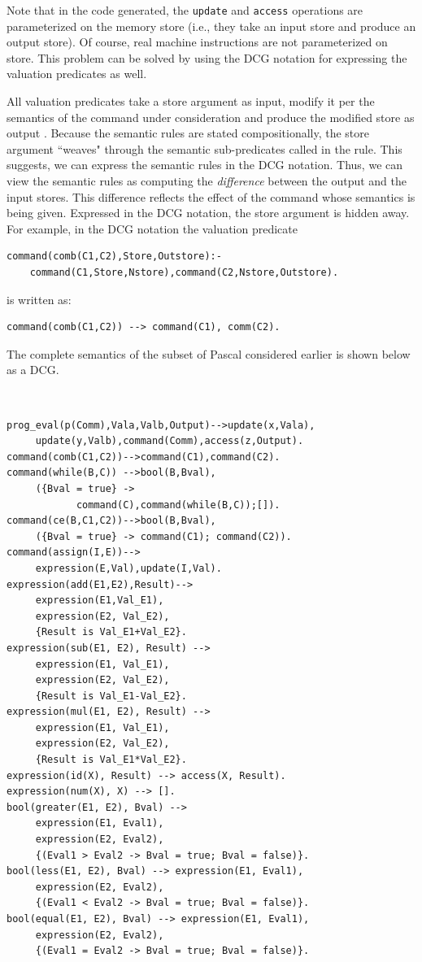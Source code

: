 \documentclass{entcs}
\begin{document}
Note that in the code generated, the {\tt update}
and {\tt access} operations are parameterized on the 
memory store (i.e., they take an input store and produce
an output store). Of course, real machine instructions
are not parameterized on store.
This problem can be solved by using the DCG notation
for expressing the valuation predicates as well.

All valuation predicates take a store
argument as input, modify it per the semantics of the
command under consideration and produce the modified
store as output \cite{logden}. Because
the semantic rules are stated compositionally, the
store argument ``weaves" through the semantic
sub-predicates called in the rule. This suggests,
we can express the semantic rules in the DCG notation.
Thus, we can view the semantic rules as computing
the {\it difference} between the output and the input
stores. This difference reflects the effect of the
command whose semantics is being given. Expressed in
the DCG notation, the store argument is hidden
away. For example, in the DCG notation the valuation predicate 

\begin{verbatim}
command(comb(C1,C2),Store,Outstore):- 
    command(C1,Store,Nstore),command(C2,Nstore,Outstore).
\end{verbatim}

\noindent
is written as:

\begin{verbatim}
command(comb(C1,C2)) --> command(C1), comm(C2).
\end{verbatim}

\noindent The complete semantics of the subset of Pascal
considered earlier is shown below as a DCG.

{\small\tt 
\begin{verbatim}
prog_eval(p(Comm),Vala,Valb,Output)-->update(x,Vala), 
     update(y,Valb),command(Comm),access(z,Output).
command(comb(C1,C2))-->command(C1),command(C2).
command(while(B,C)) -->bool(B,Bval),
     ({Bval = true} -> 
            command(C),command(while(B,C));[]).
command(ce(B,C1,C2))-->bool(B,Bval),
     ({Bval = true} -> command(C1); command(C2)).
command(assign(I,E))-->
     expression(E,Val),update(I,Val). 
expression(add(E1,E2),Result)-->
     expression(E1,Val_E1), 
     expression(E2, Val_E2), 
     {Result is Val_E1+Val_E2}.
expression(sub(E1, E2), Result) --> 
     expression(E1, Val_E1),
     expression(E2, Val_E2), 
     {Result is Val_E1-Val_E2}.
expression(mul(E1, E2), Result) --> 
     expression(E1, Val_E1),
     expression(E2, Val_E2), 
     {Result is Val_E1*Val_E2}.
expression(id(X), Result) --> access(X, Result).
expression(num(X), X) --> [].
bool(greater(E1, E2), Bval) --> 
     expression(E1, Eval1), 
     expression(E2, Eval2), 
     {(Eval1 > Eval2 -> Bval = true; Bval = false)}.
bool(less(E1, E2), Bval) --> expression(E1, Eval1), 
     expression(E2, Eval2), 
     {(Eval1 < Eval2 -> Bval = true; Bval = false)}.
bool(equal(E1, E2), Bval) --> expression(E1, Eval1), 
     expression(E2, Eval2), 
     {(Eval1 = Eval2 -> Bval = true; Bval = false)}.
\end{verbatim}
}
\end{document}
